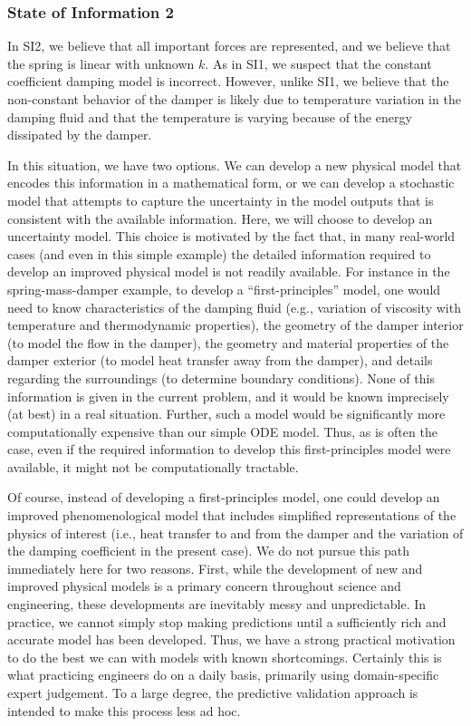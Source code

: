 \documentclass[11pt]{article}
\begin{document}
\subsubsection{State of Information 2}
In SI2, we believe that all important forces are represented, and we
believe that the spring is linear with unknown $k$.  As in SI1, we
suspect that the constant coefficient damping model is incorrect.
However, unlike SI1, we believe that the non-constant behavior of the
damper is likely due to temperature variation in the damping fluid and
that the temperature is varying because of the energy dissipated by
the damper.

In this situation, we have two options.  We can develop a new physical
model that encodes this information in a mathematical form, or we can
develop a stochastic model that attempts to capture the uncertainty in
the model outputs that is consistent with the available information.
Here, we will choose to develop an uncertainty model.  This choice is
motivated by the fact that, in many real-world cases (and even in this
simple example) the detailed information required to develop an
improved physical model is not readily available.  For instance in the
spring-mass-damper example, to develop a ``first-principles'' model,
one would need to know characteristics of the damping fluid (e.g.,
variation of viscosity with temperature and thermodynamic properties),
the geometry of the damper interior (to model the flow in the damper),
the geometry and material properties of the damper exterior (to model
heat transfer away from the damper), and details regarding the
surroundings (to determine boundary conditions).  None of this
information is given in the current problem, and it would be known
imprecisely (at best) in a real situation.  Further, such a model
would be significantly more computationally expensive than our simple
ODE model.  Thus, as is often the case, even if the required
information to develop this first-principles model were available, it
might not be computationally tractable.

Of course, instead of developing a first-principles model, one could
develop an improved phenomenological model that includes simplified
representations of the physics of interest (i.e., heat transfer to and from
the damper and the variation of the damping coefficient in the present
case).  We do not pursue this path immediately here for two reasons.
First, while the development of new and improved physical models is a
primary concern throughout science and engineering, these developments
are inevitably messy and unpredictable.  In practice, we cannot simply
stop making predictions until a sufficiently rich and accurate model
has been developed.  Thus, we have a strong practical motivation to do
the best we can with models with known shortcomings.  Certainly this
is what practicing engineers do on a daily basis, primarily using
domain-specific expert judgement.  To a large degree, the predictive
validation approach is intended to make this process less ad hoc.
\end{document}
